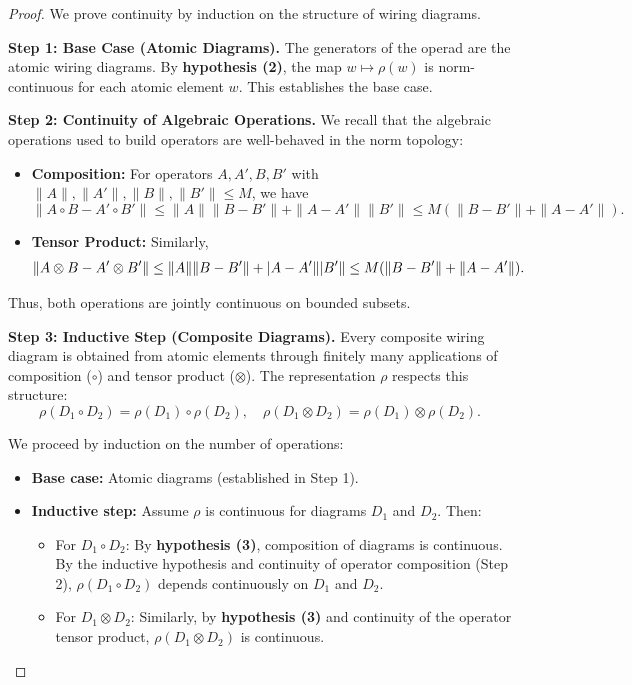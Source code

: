 \documentclass[11pt]{article}
\begin{document}
\begin{proof}
We prove continuity by induction on the structure of wiring diagrams.

\noindent\textbf{Step 1: Base Case (Atomic Diagrams).} 
The generators of the operad are the atomic wiring diagrams. By \textbf{hypothesis (2)}, the map $w \mapsto \rho(w)$ is norm-continuous for each atomic element $w$. This establishes the base case.

\noindent\textbf{Step 2: Continuity of Algebraic Operations.}
We recall that the algebraic operations used to build operators are well-behaved in the norm topology:
\begin{itemize}
    \item \textbf{Composition:} For operators $A, A', B, B'$ with $\|A\|, \|A'\|, \|B\|, \|B'\| \leq M$, we have
    \[
    \|A \circ B - A' \circ B'\| \leq \|A\|\|B - B'\| + \|A - A'\|\|B'\| \leq M(\|B - B'\| + \|A - A'\|).
    \]
    \item \textbf{Tensor Product:} Similarly,
    \[
    \|A \otimes B - A' \otimes B'\| \leq \|A\|\|B - B'\| + \\|A - A'\|\\|B'\| \leq M(\|B - B'\| + \|A - A'\|).
    \]
\end{itemize}
Thus, both operations are jointly continuous on bounded subsets.

\noindent\textbf{Step 3: Inductive Step (Composite Diagrams).}
Every composite wiring diagram is obtained from atomic elements through finitely many applications of composition ($\circ$) and tensor product ($\otimes$). The representation $\rho$ respects this structure:
\[
\rho(D_1 \circ D_2) = \rho(D_1) \circ \rho(D_2), \quad \rho(D_1 \otimes D_2) = \rho(D_1) \otimes \rho(D_2).
\]

We proceed by induction on the number of operations:
\begin{itemize}
    \item \textbf{Base case:} Atomic diagrams (established in Step 1).
    \item \textbf{Inductive step:} Assume $\rho$ is continuous for diagrams $D_1$ and $D_2$. Then:
    \begin{itemize}
        \item For $D_1 \circ D_2$: By \textbf{hypothesis (3)}, composition of diagrams is continuous. By the inductive hypothesis and continuity of operator composition (Step 2), $\rho(D_1 \circ D_2)$ depends continuously on $D_1$ and $D_2$.
        \item For $D_1 \otimes D_2$: Similarly, by \textbf{hypothesis (3)} and continuity of the operator tensor product, $\rho(D_1 \otimes D_2)$ is continuous.
    \end{itemize}
\end{itemize}


\end{proof}
\end{document}

